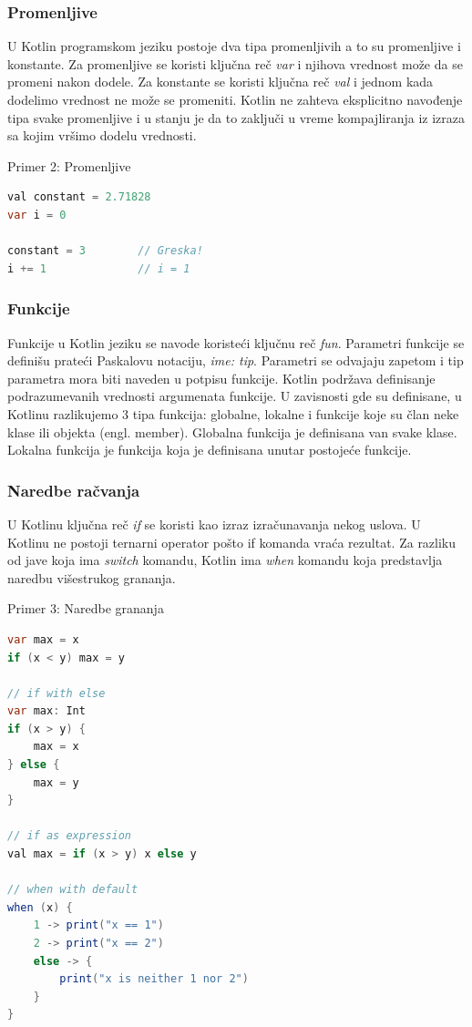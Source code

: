 \documentclass[12pt,oneside]{memoir}
\begin{document}
\subsubsection{Promenljive}
U Kotlin programskom jeziku postoje dva tipa promenljivih a to su promenljive i konstante. Za promenljive se koristi ključna reč \emph{var} i njihova vrednost može da se promeni nakon dodele. Za konstante se koristi ključna reč \emph{val} i jednom kada dodelimo vrednost ne može se promeniti. Kotlin ne zahteva eksplicitno navođenje tipa svake promenljive i u stanju je da to zaključi u vreme kompajliranja iz izraza sa kojim vršimo dodelu vrednosti.

\begin{center} Primer 2: Promenljive\end{center}
\begin{lstlisting}[language=Java]
val constant = 2.71828
var i = 0
 
constant = 3        // Greska!
i += 1              // i = 1 
\end{lstlisting}
 
\subsubsection{Funkcije}
Funkcije u Kotlin jeziku se navode koristeći ključnu reč \emph{fun}. Parametri funkcije se definišu prateći Paskalovu notaciju, \emph{ime: tip}. Parametri se odvajaju zapetom i tip parametra mora biti naveden u potpisu funkcije. Kotlin podržava definisanje podrazumevanih vrednosti argumenata funkcije. U zavisnosti gde su definisane, u Kotlinu razlikujemo 3 tipa funkcija: globalne, lokalne i funkcije koje su član neke klase ili objekta (engl. member). Globalna funkcija je definisana van svake klase. Lokalna funkcija je funkcija koja je definisana unutar postojeće funkcije.
 
\subsubsection{Naredbe račvanja}
 
U Kotlinu ključna reč \emph{if} se koristi kao izraz izračunavanja nekog uslova. U Kotlinu ne postoji ternarni operator pošto if komanda vraća rezultat. Za razliku od jave koja ima \emph{switch} komandu, Kotlin ima \emph{when} komandu koja predstavlja naredbu višestrukog grananja.

\begin{center} Primer 3: Naredbe grananja\end{center}
\begin{lstlisting}[language=Java]
var max = x
if (x < y) max = y
 
// if with else
var max: Int
if (x > y) {
    max = x
} else {
    max = y
}
 
// if as expression
val max = if (x > y) x else y
 
// when with default 
when (x) {
    1 -> print("x == 1")
    2 -> print("x == 2")
    else -> {
        print("x is neither 1 nor 2")
    }
}
\end{lstlisting}
 
\end{document}

